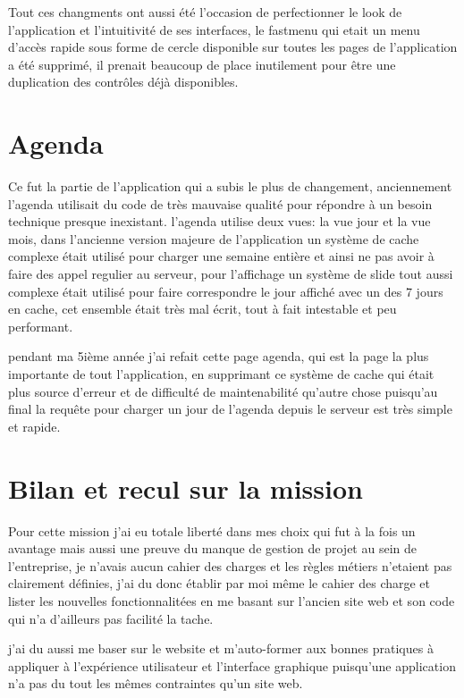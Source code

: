 Tout ces changments ont aussi été l'occasion de perfectionner le look de l'application 
et l'intuitivité de ses interfaces, le fastmenu qui etait un menu d'accès rapide sous 
forme de cercle disponible sur toutes les pages de l'application a été supprimé,
il prenait beaucoup de place inutilement pour être une duplication des contrôles 
déjà disponibles. \newline 

\section{Agenda}
Ce fut la partie de l'application qui a subis le plus de changement, anciennement l'agenda 
utilisait du code de très mauvaise qualité pour répondre à un besoin technique presque inexistant.
l'agenda utilise deux vues: la vue jour et la vue mois, dans l'ancienne version majeure
de l'application un système de cache complexe était utilisé pour charger une semaine entière 
et ainsi ne pas avoir à faire des appel regulier au serveur, pour l'affichage 
un système de slide tout aussi complexe était utilisé pour faire correspondre le jour affiché 
avec un des 7 jours en cache, cet ensemble était très mal écrit, tout à fait intestable 
et peu performant.

pendant ma 5ième année j'ai refait cette page agenda, qui est la page la plus importante 
de tout l'application, en supprimant ce système de cache qui était plus source d'erreur 
et de difficulté de maintenabilité qu'autre chose puisqu'au final la requête pour charger 
un jour de l'agenda depuis le serveur est très simple et rapide.


\newpage
\section{Bilan et recul sur la mission}
Pour cette mission j'ai eu totale liberté dans mes choix qui fut à la fois un avantage mais 
aussi une preuve du manque de gestion de projet au sein de l'entreprise, je n'avais 
aucun cahier des charges et les règles métiers n'etaient pas clairement définies,
j'ai du donc établir par moi même le cahier des charge et lister les nouvelles fonctionnalitées 
en me basant sur l'ancien site web et son code qui n'a d'ailleurs pas facilité la tache. \newline

j'ai du aussi me baser sur le website et m'auto-former aux bonnes pratiques 
à appliquer à l'expérience utilisateur et l'interface graphique puisqu'une application
n'a pas du tout les mêmes contraintes qu'un site web. \newline

